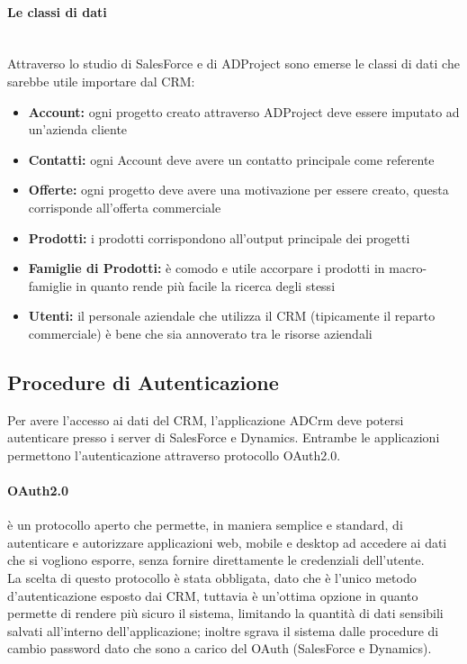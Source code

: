\documentclass[12pt,a4paper,twoside,openany,english]{book}
\begin{document}
		\paragraph{Le classi di dati}~\\
			Attraverso lo studio di SalesForce e di ADProject sono emerse le classi di dati che sarebbe utile importare dal CRM:
			\begin{itemize}
				\item \textbf{Account:} ogni progetto creato attraverso ADProject deve essere imputato ad un'azienda cliente
				\item \textbf{Contatti:} ogni Account deve avere un contatto principale come referente
				\item \textbf{Offerte:} ogni progetto deve avere una motivazione per essere creato, questa corrisponde all'offerta commerciale
				\item \textbf{Prodotti:} i prodotti corrispondono all'output principale dei progetti
				\item \textbf{Famiglie di Prodotti:} è comodo e utile accorpare i prodotti in macro-famiglie in quanto rende più facile la ricerca degli stessi 
				\item \textbf{Utenti:} il personale aziendale che utilizza il CRM (tipicamente il reparto commerciale) è bene che sia annoverato tra le risorse aziendali
			\end{itemize}
		\par
		\subsection{Procedure di Autenticazione}
			Per avere l'accesso ai dati del CRM, l'applicazione ADCrm deve potersi autenticare presso i server di SalesForce e Dynamics. Entrambe le applicazioni permettono l'autenticazione attraverso protocollo OAuth2.0.
			\paragraph{OAuth2.0}
			è un protocollo aperto che permette, in maniera semplice e standard, di autenticare e autorizzare applicazioni web, mobile e desktop ad accedere ai dati che si vogliono esporre, senza fornire direttamente le credenziali dell'utente.\\
			La scelta di questo protocollo è stata obbligata, dato che è l'unico metodo d'autenticazione esposto dai CRM, tuttavia è un'ottima opzione in quanto permette di rendere più sicuro il sistema, limitando la quantità di dati sensibili salvati all'interno dell'applicazione; inoltre sgrava il sistema dalle procedure di cambio password dato che sono a carico del  OAuth (SalesForce e Dynamics).
\end{document}
